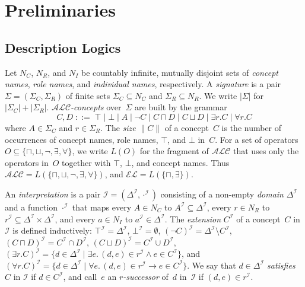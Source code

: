 \documentclass[accepted]{uai2026} %
\theoremstyle{definition}
\theoremstyle{remark}
\begin{document}
\section{Preliminaries}\label{sec:prelim}

\subsection{Description Logics}\label{sec:prelim:dl}

Let $N_C$, $N_R$, and $N_I$ be countably infinite, mutually disjoint sets of 
\emph{concept names}, \emph{role names}, and \emph{individual names}, respectively. A \emph{signature} is a pair
$\Sigma = (\Sigma_C, \Sigma_R)$ of finite
sets $\Sigma_C \subseteq N_C$ and $\Sigma_R \subseteq N_R$.
We write $|\Sigma|$ for $|\Sigma_C| + |\Sigma_R|$.
\emph{$\mathcal{ALC}$-concepts} over~$\Sigma$ are built by the
grammar
%
\[
  C,D \;::=\; \top \mid \bot \mid A
    \mid \neg C \mid C \sqcap D \mid C \sqcup D
    \mid \exists r.C \mid \forall r.C
\]
%
where $A \in \Sigma_C$ and $r \in \Sigma_R$.
The \emph{size} $\|C\|$ of a concept~$C$ is the number of
occurrences of concept names, role names, $\top$, and $\bot$ in~$C$.
For a set of operators
$O \subseteq \{\sqcap, \sqcup, \neg, \exists, \forall\}$, we write
$L(O)$ for the fragment of $\mathcal{ALC}$ that uses only the
operators in~$O$ together with $\top$, $\bot$, and concept names.
Thus $\mathcal{ALC} = L(\{\sqcap, \sqcup, \neg, \exists, \forall\})$,
and $\mathcal{EL} = L(\{\sqcap, \exists\})$.

An \emph{interpretation} is a pair
$\mathcal{I} = (\Delta^{\mathcal{I}}, {\cdot}^{\mathcal{I}})$
consisting of a non-empty \emph{domain} $\Delta^{\mathcal{I}}$ and a
function ${\cdot}^{\mathcal{I}}$ that maps every $A \in N_C$ to
$A^{\mathcal{I}} \subseteq \Delta^{\mathcal{I}}$, every $r \in N_R$
to $r^{\mathcal{I}} \subseteq \Delta^{\mathcal{I}} \times
\Delta^{\mathcal{I}}$, and every $a \in N_I$ to
$a^{\mathcal{I}} \in \Delta^{\mathcal{I}}$.
The \emph{extension} $C^{\mathcal{I}}$ of a concept~$C$ in
$\mathcal{I}$ is defined inductively:
$\top^{\mathcal{I}} = \Delta^{\mathcal{I}}$,
$\bot^{\mathcal{I}} = \emptyset$,
$(\neg C)^{\mathcal{I}} = \Delta^{\mathcal{I}} \setminus
C^{\mathcal{I}}$,
$(C \sqcap D)^{\mathcal{I}} = C^{\mathcal{I}} \cap
D^{\mathcal{I}}$,
$(C \sqcup D)^{\mathcal{I}} = C^{\mathcal{I}} \cup
D^{\mathcal{I}}$,
$(\exists r.C)^{\mathcal{I}} = \{ d \in \Delta^{\mathcal{I}} \mid
\exists e.\, (d,e) \in r^{\mathcal{I}} \wedge e \in
C^{\mathcal{I}}\}$, and
$(\forall r.C)^{\mathcal{I}} = \{ d \in \Delta^{\mathcal{I}} \mid
\forall e.\, (d,e) \in r^{\mathcal{I}} \rightarrow e \in
C^{\mathcal{I}}\}$.
We say that $d \in \Delta^{\mathcal{I}}$ \emph{satisfies}~$C$ in
$\mathcal{I}$ if $d \in C^{\mathcal{I}}$, and
call~$e$ an \emph{$r$-successor} of~$d$ in~$\mathcal{I}$ if
$(d,e) \in r^{\mathcal{I}}$.
\end{document}
